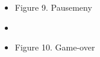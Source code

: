 \documentclass[paper=a4]{article}
\begin{document}
\begin{center}
{\begin{itemize}
			\item {\hfil Figure 9. Pausemeny}
			\bigskip
			\bigskip
			\bigskip
			\item{}
			\item {\hfil Figure 10. Game-over}
		\end{itemize}
	}
	\end{center} 

\newpage
\end{document}
